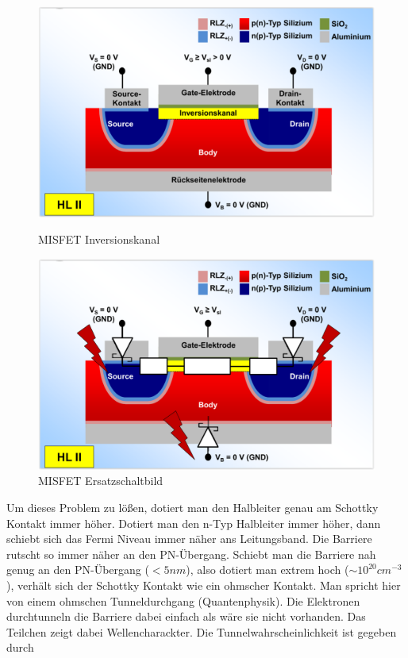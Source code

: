 \documentclass[12pt,a4paper]{report}%
\numberwithin{equation}{section}
\numberwithin{equation}{subsection}
\begin{document}
			\begin{figure}[H] 
				\centering
				\begin{minipage}{.5\textwidth}
				  \centering
				  \captionsetup{justification=centering}
				  \includegraphics[width=0.95\linewidth]{misfet_inversionskanal.png}
				  \caption{MISFET Inversionskanal \protect\cite{MIKRO2}}
				  \label{fig:misfet_inversionskanal}
				\end{minipage}%
				\begin{minipage}{.5\textwidth}
				  \centering
				  \captionsetup{justification=centering}
				  \includegraphics[width=0.95\linewidth]{misfet_stromfluss.png}
				  \caption{MISFET Ersatzschaltbild \protect\cite{MIKRO2}}
				  \label{fig:misfet_stromfluss}
				\end{minipage}
		  \end{figure}
    Um dieses Problem zu lößen, dotiert man den Halbleiter genau am Schottky Kontakt immer höher. Dotiert man den n-Typ Halbleiter immer höher, dann schiebt sich das Fermi Niveau immer näher ans Leitungsband. Die Barriere rutscht so immer näher an den PN-Übergang. Schiebt man die Barriere nah genug an den PN-Übergang ($<5nm$), also dotiert man extrem hoch ($\sim 10^{20}cm^{-3}$), verhält sich der Schottky Kontakt wie ein ohmscher Kontakt. Man spricht hier von einem ohmschen Tunneldurchgang (Quantenphysik). Die Elektronen durchtunneln die Barriere dabei einfach als wäre sie nicht vorhanden. Das Teilchen zeigt dabei Wellencharackter. Die Tunnelwahrscheinlichkeit ist gegeben durch
\end{document}
